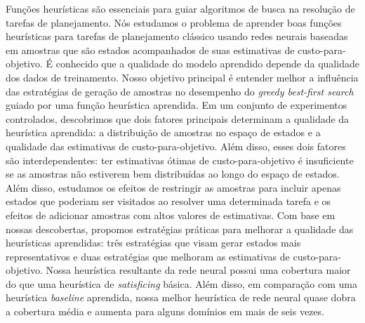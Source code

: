 \begin{translatedabstract}
    Funções heurísticas são essenciais para guiar algoritmos de busca na resolução de tarefas de planejamento.
    Nós estudamos o problema de aprender boas funções heurísticas para tarefas de planejamento clássico usando redes neurais baseadas em amostras que são estados acompanhados de suas estimativas de custo-para-objetivo. É conhecido que a qualidade do modelo aprendido depende da qualidade dos dados de treinamento. Nosso objetivo principal é entender melhor a influência das estratégias de geração de amostras no desempenho do \emph{greedy best-first search} guiado por uma função heurística aprendida.
    Em um conjunto de experimentos controlados, descobrimos que dois fatores principais determinam a qualidade da heurística aprendida: a distribuição de amostras no espaço de estados e a qualidade das estimativas de custo-para-objetivo. Além disso, esses dois fatores são interdependentes: ter estimativas ótimas de custo-para-objetivo é insuficiente se as amostras não estiverem bem distribuídas ao longo do espaço de estados.
    Além disso, estudamos os efeitos de restringir as amostras para incluir apenas estados que poderiam ser visitados ao resolver uma determinada tarefa e os efeitos de adicionar amostras com altos valores de estimativas.
    Com base em nossas descobertas, propomos estratégias práticas para melhorar a qualidade das heurísticas aprendidas: três estratégias que visam gerar estados mais representativos e duas estratégias que melhoram as estimativas de custo-para-objetivo.
    Nossa heurística resultante da rede neural possui uma cobertura maior do que uma heurística de \emph{satisficing} básica. Além disso, em comparação com uma heurística \emph{baseline} aprendida, nossa melhor heurística de rede neural quase dobra a cobertura média e aumenta para alguns domínios em mais de seis vezes.
\end{translatedabstract}
